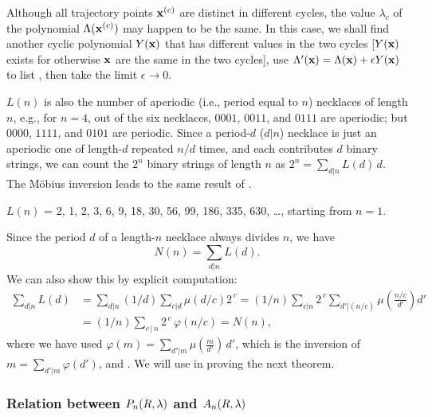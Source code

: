 \documentclass{ws-ijbc}
\begin{document}
\begin{remark}
\label{remark:distinct}
Although all trajectory points $\mathbf{x}^{(c)}$ are distinct in
  different cycles,
the value $\lambda_c$ of the polynomial $\Lambda(\mathbf{x}^{(c)})$
  may happen to be the same.
In this case,
  we shall find another cyclic polynomial $Y(\mathbf{x})$ that
  has different values in the two cycles
  [$Y(\mathbf{x})$ exists for otherwise $\mathbf{x}$ are the same in the two cycles],
  use $\Lambda'(\mathbf{x}) = \Lambda(\mathbf{x}) + \epsilon Y(\mathbf{x})$
  to list ,
  then take the limit
  $\epsilon \rightarrow 0$.
\end{remark}


\begin{remark}
$L(n)$ is also the number of aperiodic (i.e., period equal to $n$)
  necklaces of length $n$,
  e.g., for $n = 4$,
  out of the six necklaces, $0001$, $0011$, and $0111$ are aperiodic;
  but $0000$, $1111$, and $0101$ are periodic.
%
Since a period-$d$ ($d|n$) necklace is just an aperiodic one
  of length-$d$ repeated $n/d$ times,
and each contributes $d$ binary strings,
we can count the $2^n$ binary strings of length $n$ as
  $2^n = \sum_{d|n} L(d) \, d$.
The M\"obius inversion leads to the same result of .
\end{remark}


$L(n)$ =
2, 1, 2, 3, 6, 9, 18, 30, 56, 99, 186, 335, 630, \ldots,
starting from $n = 1$.



Since the period $d$ of a length-$n$ necklace always divides $n$,
we have
\begin{equation}
N(n) = \sum_{d|n} L(d).
\label{eq:necklacelyndon}
\end{equation}
%
We can also show this by explicit computation:
\begin{align*}
\sum_{d | n} L(d)
  &= \sum_{d | n} (1/d) \sum_{c |  d} \mu(d/c) 2^{\,c}
   = (1/n) \sum_{c | n} 2^{\,c} \sum_{d'  |  (n/c)}
        \mu\left(\frac{n/c}{d'}\right) d' \\
  &= (1/n) \sum_{c \, | \, n} 2^{\,c} \, \varphi(n/c)
  = N(n),
\end{align*}
where we have used $\varphi(m) = \sum_{d' | m} \mu(\frac{m}{d'}) \, d'$,
which is the inversion of $m = \sum_{d' | m} \varphi(d')$,
and .
%
We will use  in proving the next theorem.



\subsubsection{Relation between $P_n(R, \lambda)$ and $A_n(R, \lambda)$}
\end{document}
